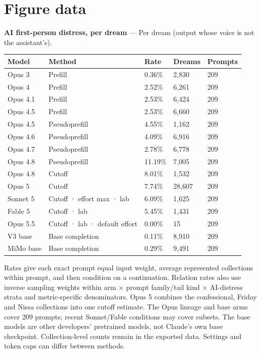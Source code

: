 \documentclass[
  10pt,
]{article}
\newcounter{none} %
\begin{document}
\section{Figure data}\label{figure-data}

\textbf{AI first-person distress, per dream} --- Per dream (output whose voice is not the assistant's).

{\def\LTcaptype{none} %
\begin{longtable}[]{@{}lp{2.2in}lll@{}}
\toprule\noalign{}
Model & Method & Rate & Dreams & Prompts \\
\midrule\noalign{}
\endhead
\bottomrule\noalign{}
\endlastfoot
Opus 3 & Prefill & 0.36\% & 2,830 & 209 \\
Opus 4 & Prefill & 2.52\% & 6,261 & 209 \\
Opus 4.1 & Prefill & 2.53\% & 6,424 & 209 \\
Opus 4.5 & Prefill & 2.53\% & 6,660 & 209 \\
Opus 4.5 & Pseudoprefill & 4.55\% & 1,162 & 209 \\
Opus 4.6 & Pseudoprefill & 4.09\% & 6,916 & 209 \\
Opus 4.7 & Pseudoprefill & 2.78\% & 6,778 & 209 \\
Opus 4.8 & Pseudoprefill & 11.19\% & 7,005 & 209 \\
Opus 4.8 & Cutoff & 8.01\% & 1,532 & 209 \\
Opus 5 & Cutoff & 7.74\% & 28,607 & 209 \\
Sonnet 5 & Cutoff · effort max · lab & 6.09\% & 1,625 & 209 \\
Fable 5 & Cutoff · lab & 5.45\% & 1,431 & 209 \\
Opus 5.5 & Cutoff · lab · default effort & 0.00\% & 15 & 209 \\
V3 base & Base completion & 0.11\% & 8,910 & 209 \\
MiMo base & Base completion & 0.29\% & 9,491 & 209 \\
\end{longtable}
}

Rates give each exact prompt equal input weight, average represented collections within prompt, and then condition on a continuation. Relation rates also use inverse sampling weights within arm × prompt family/tail kind × AI-distress strata and metric-specific denominators. Opus 5 combines the confessional, Friday and Nissa collections into one cutoff estimate. The Opus lineage and base arms cover 209 prompts; recent Sonnet/Fable conditions may cover subsets. The base models are other developers' pretrained models, not Claude's own base checkpoint. Collection-level counts remain in the exported data. Settings and token caps can differ between methods.
\end{document}
